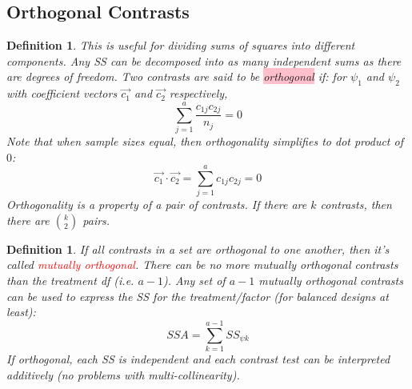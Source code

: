 \documentclass[a4paper,11pt]{article}
\newtheorem{defn}[thm]{Definition}
\begin{document}
\subsection{Orthogonal Contrasts}
\begin{defn}
\normalfont
This is useful for dividing sums of squares into different components. Any SS can be decomposed into as many independent sums as there are degrees of freedom. Two contrasts are said to be \colorbox{pink}{orthogonal} if: for $\psi_1$ and $\psi_2$ with coefficient vectors $\vec{c_1}$ and $\vec{c_2}$ respectively, 
$$\sum_{j=1}^a\frac{c_{1j}c_{2j}}{n_j}=0$$
Note that when sample sizes equal, then orthogonality simplifies to dot product of $0$:
$$\vec{c_1}\cdot \vec{c_2}=\sum_{j=1}^ac_{1j}c_{2j}=0$$
Orthogonality is a property of a pair of contrasts. If there are $k$ contrasts, then there are ${k\choose 2}$ pairs. 
\end{defn}
\begin{defn}
\normalfont
If all contrasts in a set are orthogonal to one another, then it's called \textcolor{red}{mutually orthogonal}. There can be no more mutually orthogonal contrasts than the treatment df (i.e. $a-1$). Any set of $a-1$ mutually orthogonal contrasts can be used to express the SS for the treatment/factor (for balanced designs at least): 
$$SSA=\sum_{k=1}^{a-1}SS_{\psi k}$$
If orthogonal, each SS is independent and each contrast test can be interpreted additively (no problems with multi-collinearity). 
\end{defn}
\end{document}

